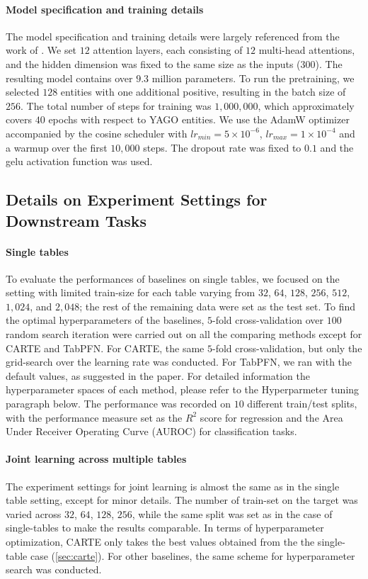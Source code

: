 \documentclass{article}
\theoremstyle{plain}
\theoremstyle{definition}
\theoremstyle{remark}
\begin{document}
\paragraph{Model specification and training details}
The model specification and training details were largely referenced from the work of \cite{devlinBERTPretrainingDeep2019}. We set $12$ attention layers, each consisting of $12$ multi-head attentions, and the hidden dimension was fixed to the same size as the inputs ($300$). The resulting model contains over $9.3$ million parameters. To run the pretraining, we selected $128$ entities with one additional positive, resulting in the batch size of $256$. The total number of steps for training was $1,000,000$, which approximately covers $40$ epochs with respect to YAGO entities. We use the AdamW optimizer accompanied by the cosine scheduler with $lr_{min}=5\times 10^{-6}$, $lr_{max}=1\times 10^{-4}$ and a warmup over the first $10,000$ steps. The dropout rate was fixed to $0.1$ and the gelu activation function was used.

\subsection{Details on Experiment Settings for Downstream Tasks}\label{app:exp_settings}

\paragraph{Single tables} To evaluate the performances of baselines on single tables, we focused on the setting with limited train-size for each table varying from $32$, $64$, $128$, $256$, $512$, $1,024$, and $2,048$; the rest of the remaining data were set as the test set. To find the optimal hyperparameters of the baselines, $5$-fold cross-validation over $100$ random search iteration were carried out on all the comparing methods except for CARTE and TabPFN. For CARTE, the same $5$-fold cross-validation, but only the grid-search over the learning rate was conducted. For TabPFN, we ran with the default values, as suggested in the paper. For detailed information the hyperparameter spaces of each method, please refer to the Hyperparmeter tuning paragraph below. The performance was recorded on $10$ different train/test splits, with the performance measure set as the $R^2$ score for regression and the Area Under Receiver Operating Curve (AUROC) for classification tasks.

\paragraph{Joint learning across multiple tables} The experiment settings for joint learning is almost the same as in the single table setting, except for minor details. The number of train-set on the target was varied across $32$, $64$, $128$, $256$, while the same split was set as in the case of single-tables to make the results comparable. In terms of hyperparameter optimization, CARTE only takes the best values obtained from the the single-table case (\autoref{sec:carte}). For other baselines, the same scheme for hyperparameter search was conducted.
\end{document}
